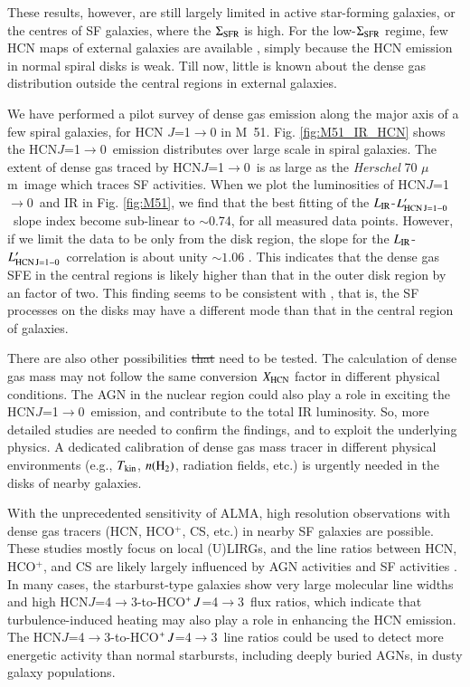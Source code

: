 \documentclass[legal,11pt]{article}
\def\,{\thinspace}
\def\Tkin{$T_{\rm kin}$}
\def\to{$\rightarrow$}
\def\mum{$\mu$m}
\def\nHtwo{$n({\rm H}_2)$}
\def\LIR     {$L_{\rm IR}$}
\def\LHCNoz  {$L'_{\rm HCN\, J=1-0}$}
\def\HCOP       {HCO$^{+}$}
\def\HCNoz      {HCN\,$J$=1$\rightarrow$0}
\def\HCNft        {HCN\,$J$=4$\rightarrow$3}
\def\HCOPft     {HCO$^+\,J$=4$\rightarrow$3}
\providecommand{\DIFdeltex}[1]{{\protect\color{red}\sout{#1}}}                      %
\providecommand{\DIFdelbegin}{} %
\providecommand{\DIFdelend}{} %
\providecommand{\DIFdel}[1]{\texorpdfstring{\DIFdeltex{#1}}{}} %
\begin{document}
These results, however, are still largely limited in active star-forming
galaxies, or the centres of SF galaxies, where the $\Sigma_{\rm SFR}$ is high.
For the low-$\Sigma_{\rm SFR}$ regime, few HCN maps of external galaxies are
available \citep[e.g.,][]{Nguyen1992,gs04a,Kepley2014}, simply because the HCN
emission in normal spiral disks is weak. Till now, little is known about the
dense gas distribution outside the central regions in external galaxies. 

We have performed a  pilot survey of dense gas emission along the major axis of
a few spiral galaxies, for HCN $J$=1\to0 in M~51. Fig. \ref{fig:M51_IR_HCN}
shows the \HCNoz\ emission distributes over large scale in spiral galaxies. The
extent of dense gas traced by \HCNoz\ is as large as the {\it Herschel} 70 \mum\
image which traces SF activities.  When we plot the luminosities of \HCNoz\ and
IR in Fig. \ref{fig:M51}, we find that the best fitting of the \LIR-\LHCNoz\
slope index become sub-linear to $\sim$0.74, for all measured data points.
However, if we limit the data to be only from the disk region, the slope for
the \LIR-\LHCNoz\ correlation is about unity $\sim 1.06$ \citep{Chen15}. This
indicates that the dense gas SFE in the central regions is likely higher than
that in the outer disk region by an factor of two. This finding seems to be
consistent with \citep{usero15}, that is, the SF processes on the disks may
have a different mode than that in the central region of galaxies.


There are also other possibilities \DIFdelbegin \DIFdel{that }\DIFdelend need to be tested. The calculation of
dense gas mass may not follow the same conversion $X_{\rm HCN}$ factor in
different physical conditions. The AGN in the nuclear region could also play a
role in exciting the \HCNoz\ emission, and contribute to the total IR
luminosity.  So, more detailed studies are needed to confirm the findings, and
to exploit the underlying physics. A dedicated calibration of dense gas mass
tracer in different physical environments (e.g., \Tkin, \nHtwo, radiation
fields, etc.) is urgently needed in the disks of nearby galaxies.





With the unprecedented sensitivity of ALMA, high resolution observations with
dense gas tracers (HCN, \HCOP, CS, etc.) in nearby SF galaxies are possible.
These studies mostly focus on local (U)LIRGs, and the line ratios between HCN,
\HCOP, and CS are likely largely influenced  by AGN activities
\citep[e.g.,][]{Izumi2013,Martin2015,GB2014, Imanishi2014} and SF activities
\citep[e.g.,][]{Meier2015}. In many cases, the starburst-type galaxies show
very large molecular line widths and high \HCNft-to-\HCOPft\ flux ratios, which
indicate that turbulence-induced heating may also play a role in enhancing the
HCN emission. The \HCNft-to-\HCOPft\ line ratios could be used to detect more
energetic activity than normal starbursts, including deeply buried AGNs, in
dusty galaxy populations\citep[e.g.,][]{Imanishi2014}.  
\end{document}
